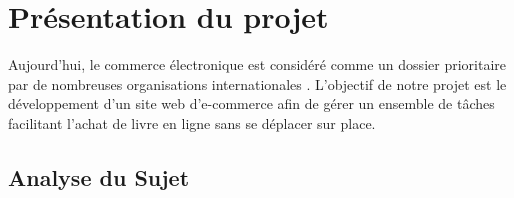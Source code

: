 

\chapter{Présentation du projet}

Aujourd’hui, le commerce électronique est considéré comme un dossier prioritaire par de nombreuses organisations internationales . L'objectif de notre projet est le développement d’un site web d’e-commerce afin de gérer un ensemble de tâches facilitant l’achat de livre en ligne sans se déplacer sur place.

\section{Analyse du Sujet}




